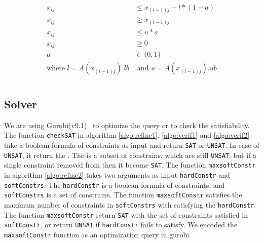 \begin{align}
    \label{eq:reluexact}
    \begin{split}
        x_{ij} &\leq x_{(i-1)j} - l*(1-a) \\
        x_{ij} &\geq x_{(i-1)j} \\
        x_{ij} &\leq u*a \\
        x_{ij} &\geq 0 \\
        a &\in \{0,1\} \\ 
        \text{where }l = A(x_{(i-1)j}).lb &\text{ and }u = A(x_{(i-1)j}).ub \\
    \end{split}
\end{align}


\subsection{Solver}
\label{sec:solver}

We are using Gurobi(v9.1)~\cite{gurobi} to optimize the query or to check the satisfiability. 
The function \texttt{checkSAT} in algorithm \ref{algo:refine1}, \ref{algo:verif1} and \ref{algo:verif2} 
take a boolean formula of constraints as input and return \texttt{SAT} or \texttt{UNSAT}. 
In case of \texttt{UNSAT}, it return the \unsatcore{}. 
The \unsatcore{} is a subset of constrains, which are still \texttt{UNSAT}, 
but if a single constraint removed from \unsatcore then it become \texttt{SAT}.
The function \texttt{maxsoftConstr} in algorithm \ref{algo:refine2} takes two arguments as input \texttt{hardConstr} and \texttt{softConstrs}. 
The \texttt{hardConstr} is a boolean formula of constraints, and \texttt{softConstrs} is a set of constrains. 
The function \texttt{maxsoftConstr} satisfies the maximum number of constraints in \texttt{softConstrs} with satisfying the \texttt{hardConstr}. 
The function \texttt{maxsoftConstr} return \texttt{SAT} with the set of constraints satisfied in \texttt{softConstr}, or return
\texttt{UNSAT} if \texttt{hardConstr} fails to satisfy. We encoded the \texttt{maxsoftConstr} function as an optimization 
query in gurobi. 



